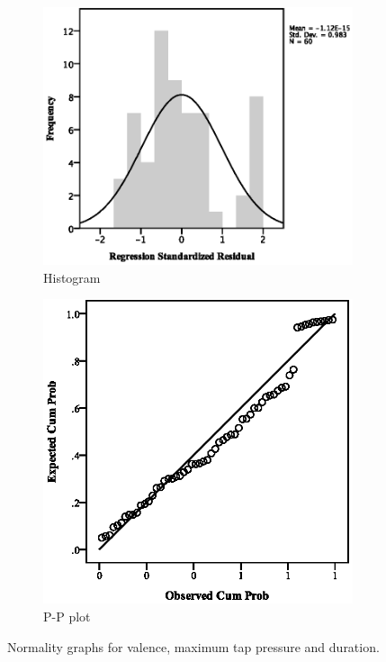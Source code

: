 \begin{figure}[ht]
\centering
\begin{subfigure}[b]{0.45\textwidth}
    \centering
    \includegraphics[width=\textwidth]{images/normality/ValMax/HistValMax.eps}
    \caption{Histogram}
    \label{fig:histvalmax}
\end{subfigure}
\quad
\begin{subfigure}[b]{0.45\textwidth}
    \centering
    \includegraphics[width=\textwidth]{images/normality/ValMax/PPValMax.eps}
    \caption{P-P plot}
    \label{fig:ppvalmax}
\end{subfigure}
\caption{Normality graphs for valence, maximum tap pressure and duration.}
\end{figure}
